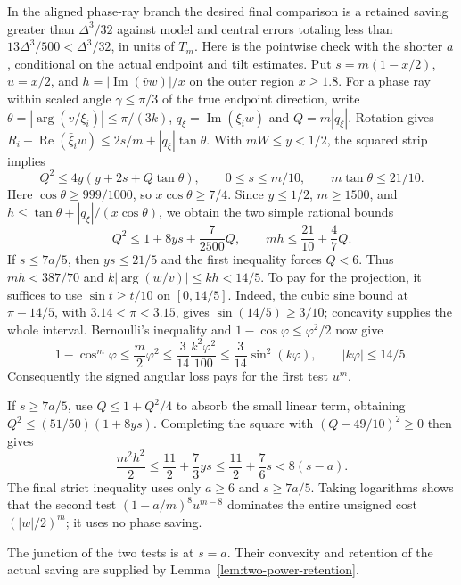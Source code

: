 \documentclass[11pt]{article}
\begin{document}
	In the aligned phase-ray branch the desired final comparison is a
	retained saving greater than $\Delta^3/32$ against model and central
	errors totaling less than $13\Delta^3/500<\Delta^3/32$, in units of $T_m$.
	Here is the pointwise check with the shorter $a$, conditional on the
	actual endpoint and tilt estimates.  Put
	$s=m(1-x/2)$, $u=x/2$, and
	$h=|\operatorname{Im}(\bar v w)|/x$ on the outer region $x\geq1.8$.
	For a phase ray within scaled angle $\gamma\leq\pi/3$ of the true
	endpoint direction, write
	$\theta=|\arg(v/\xi_i)|\leq\pi/(3k)$,
	$q_\xi=\operatorname{Im}(\bar\xi_iw)$ and
	$Q=m|q_\xi|$.  Rotation gives
	$R_i-\operatorname{Re}(\bar\xi_iw)
	\leq2s/m+|q_\xi|\tan\theta$.
	With $mW\leq y<1/2$, the squared strip implies
	\[
	Q^2\leq4y(y+2s+Q\tan\theta),
	\qquad 0\leq s\leq m/10,
	\qquad m\tan\theta\leq21/10.
	\]
	Here $\cos\theta\geq999/1000$, so $x\cos\theta\geq7/4$.
	Since $y\leq1/2$, $m\geq1500$, and
	$h\leq\tan\theta+|q_\xi|/(x\cos\theta)$, we obtain the two
	simple rational bounds
	\[
	Q^2\leq1+8ys+\frac7{2500}Q,
	\qquad mh\leq\frac{21}{10}+\frac47Q.
	\]
	If $s\leq7a/5$, then $ys\leq21/5$ and the first inequality
	forces $Q<6$.  Thus $mh<387/70$ and
	$k|\arg(w/v)|\leq kh<14/5$.
	To pay for the projection, it suffices to use
	$\sin t\geq t/10$ on $[0,14/5]$.  Indeed, the cubic sine bound
	at $\pi-14/5$, with $3.14<\pi<3.15$, gives
	$\sin(14/5)\geq3/10$; concavity supplies the whole interval.
	Bernoulli's inequality and $1-\cos\varphi\leq\varphi^2/2$
	now give
	\[
	1-\cos^m\varphi\leq\frac m2\varphi^2
	\leq\frac3{14}\frac{k^2\varphi^2}{100}
	\leq\frac3{14}\sin^2(k\varphi),
	\qquad |k\varphi|\leq14/5.
	\]
	Consequently the signed angular loss pays for the first test $u^m$.
	
	If $s\geq7a/5$, use $Q\leq1+Q^2/4$ to absorb the small linear
	term, obtaining $Q^2\leq(51/50)(1+8ys)$.  Completing the square
	with $(Q-49/10)^2\geq0$ then gives
	\[
	\frac{m^2h^2}{2}\leq\frac{11}{2}+\frac73ys
	\leq\frac{11}{2}+\frac76s<8(s-a).
	\]
	The final strict inequality uses only $a\geq6$ and $s\geq7a/5$.
	Taking logarithms shows that the
	second test $(1-a/m)^8u^{m-8}$ dominates the entire unsigned
	cost $(|w|/2)^m$; it uses no phase saving.
	
	The junction of the two tests is at $s=a$.  Their convexity and
	retention of the actual saving are supplied by
	Lemma~\ref{lem:two-power-retention}.
	
\end{document}

